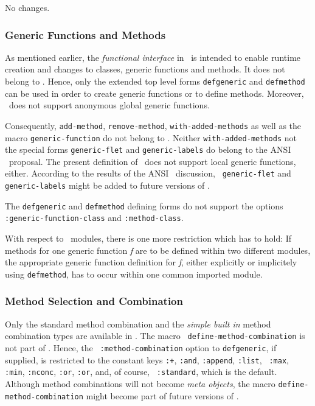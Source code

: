 No changes.

\subsubsection{Generic Functions and Methods}
\label{generic}

As mentioned earlier, the {\em functional interface} in \CLOS\ is intended 
to enable runtime creation and changes to classes, generic functions and 
methods. It does not belong to . Hence, only the extended top level forms 
{\tt defgeneric} and {\tt defmethod} can be used in order to create generic 
functions or to define methods. Moreover, \ does not support anonymous 
global generic functions.

Consequently, {\tt add-method}, {\tt remove-method}, {\tt with-added-methods} 
as well as the macro {\tt generic-function} do not belong to . 
Neither {\tt with-added-methods} not the special forms {\tt generic-flet} 
and {\tt generic-labels} do belong to the ANSI \CL\ proposal.
The present definition of \ does not support local generic functions, 
either. According to the results of the ANSI \CL\ discussion, {\tt 
generic-flet} and {\tt generic-labels} might be added to future versions of 
.

The {\tt defgeneric} and {\tt defmethod} defining forms do not support the 
options {\tt :generic-function-class} and {\tt :method-class}.

With respect to \ modules, there is one more restriction which has to hold: If methods 
for one generic function {\it f} are to be defined within two different 
modules, the appropriate generic function definition for {\it f}, either 
explicitly or implicitely using {\tt defmethod}, has to occur within one 
common imported module.

\subsubsection{Method Selection and Combination}
\label{methodselection}

Only the standard method combination and the {\em simple built in} method 
combination types are available in . The macro {\tt 
define-method-combination} is not part of . Hence, the {\tt 
:method-combination} option to {\tt defgeneric}, if supplied, is restricted 
to the constant keys {\tt :+}, {\tt :and}, {\tt :append}, {\tt :list}, {\tt 
:max}, {\tt :min}, {\tt :nconc}, {\tt :or}, {\tt :or}, and, of course, {\tt 
:standard}, which is the default. Although method combinations will not 
become {\em meta objects}, the macro {\tt define-method-combination} might 
become part of future versions of .

